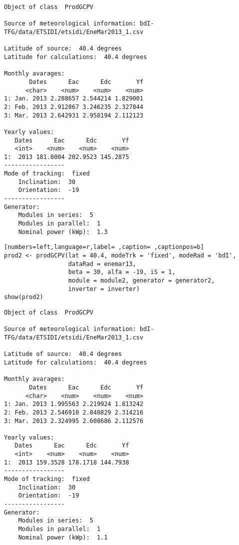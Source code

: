 \begin{verbatim}
Object of class  ProdGCPV 

Source of meteorological information: bdI-TFG/data/ETSIDI/etsidi/EneMar2013_1.csv 

Latitude of source:  40.4 degrees
Latitude for calculations:  40.4 degrees

Monthly avarages:
       Dates      Eac      Edc       Yf
      <char>    <num>    <num>    <num>
1: Jan. 2013 2.288657 2.544214 1.829001
2: Feb. 2013 2.912867 3.246235 2.327844
3: Mar. 2013 2.642931 2.958194 2.112123

Yearly values:
   Dates      Eac      Edc       Yf
   <int>    <num>    <num>    <num>
1:  2013 181.8004 202.9523 145.2875
-----------------
Mode of tracking:  fixed 
    Inclination:  30 
    Orientation:  -19 
-----------------
Generator:
    Modules in series:  5 
    Modules in parallel:  1 
    Nominal power (kWp):  1.3
\end{verbatim}

\begin{lstlisting}[numbers=left,language=r,label= ,caption= ,captionpos=b]
prod2 <- prodGCPV(lat = 40.4, modeTrk = 'fixed', modeRad = 'bdI',
                  dataRad = enemar13,
                  beta = 30, alfa = -19, iS = 1,
                  module = module2, generator = generator2,
                  inverter = inverter)
show(prod2)
\end{lstlisting}

\begin{verbatim}
Object of class  ProdGCPV 

Source of meteorological information: bdI-TFG/data/ETSIDI/etsidi/EneMar2013_1.csv 

Latitude of source:  40.4 degrees
Latitude for calculations:  40.4 degrees

Monthly avarages:
       Dates      Eac      Edc       Yf
      <char>    <num>    <num>    <num>
1: Jan. 2013 1.995563 2.219924 1.813242
2: Feb. 2013 2.546910 2.840829 2.314216
3: Mar. 2013 2.324995 2.608686 2.112576

Yearly values:
   Dates      Eac      Edc       Yf
   <int>    <num>    <num>    <num>
1:  2013 159.3528 178.1718 144.7938
-----------------
Mode of tracking:  fixed 
    Inclination:  30 
    Orientation:  -19 
-----------------
Generator:
    Modules in series:  5 
    Modules in parallel:  1 
    Nominal power (kWp):  1.1
\end{verbatim}

